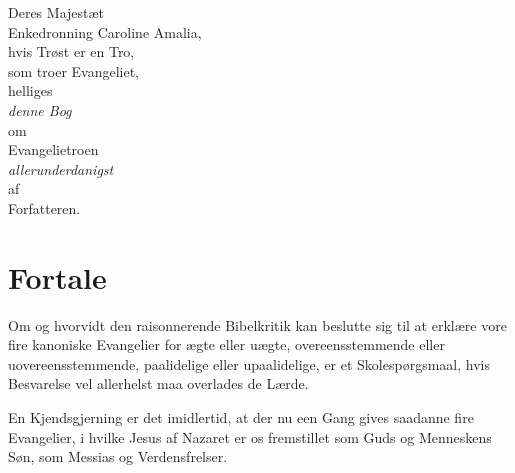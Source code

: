 \documentclass[12pt,a4paper]{book}
\begin{document}
\newpage

\begin{center}
  {\large Deres Majestæt}\\[18pt]
  {\LARGE Enkedronning Caroline Amalia,}\\[20pt]
  hvis Trøst er en Tro,\\
  som troer Evangeliet,\\[20pt]
  helliges\\[14pt]
  \emph{denne Bog}\\[8pt]
  {\footnotesize om}\\[10pt]
  {\large Evangelietroen}\\[22pt]
  \emph{allerunderdanigst}\\[8pt]
  af\\[8pt]
  {\large Forfatteren.}
\end{center}

\newpage

\chapter*{Fortale}
\label{ch:fortale}

Om og hvorvidt den raisonnerende Bibelkritik kan beslutte sig til at erklære
vore fire kanoniske Evangelier for ægte eller uægte, overeensstemmende eller
uovereensstemmende, paalidelige eller upaalidelige, er et Skolespørgsmaal,
hvis Besvarelse vel allerhelst maa overlades de Lærde.

En Kjendsgjerning er det imidlertid, at der nu een Gang gives saadanne fire
Evangelier, i hvilke Jesus af Nazaret er os fremstillet som Guds og
Menneskens Søn, som Messias og Verdensfrelser.
\end{document}
